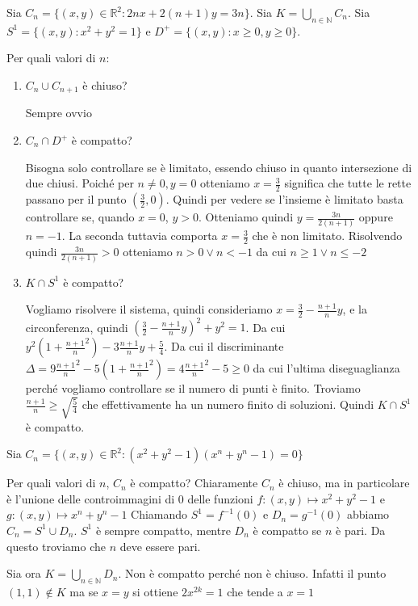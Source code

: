 \begin{example}
    Sia \(C_n = \{(x, y) \in \mathbb{R}^2 : 2 n x + 2 (n+1) y = 3n\} \). Sia \(K
    = \bigcup_{n \in \mathbb{N}} C_n\). Sia \(S^{1} = \{(x, y) : x^2+y^2 = 1\}
    \) e \(D^{+} = \{(x, y) : x \ge 0, y \ge 0\} \).

    Per quali valori di \(n\):
\begin{enumerate}[label = \arabic*.]
    \item \(C_n \cup C_{n+1}\) è chiuso?

        Sempre ovvio
    \item \(C_n \cap D^{+}\) è compatto?

        Bisogna solo controllare se è limitato, essendo chiuso in quanto
        intersezione di due chiusi.
        Poiché per \(n\neq 0, y = 0\) otteniamo \(x = \frac{3}{2}\) significa
        che tutte le rette passano per il punto \((\frac{3}{2}, 0)\). Quindi per
        vedere se l'insieme è limitato basta controllare se, quando \(x=0\), \(y
        > 0\). Otteniamo quindi \(y = \frac{3n}{2(n+1)}\) oppure \(n = -1\). La
        seconda tuttavia comporta \(x = \frac{3}{2}\) che è non limitato.
        Risolvendo quindi \(\frac{3n}{2(n+1)} > 0\) otteniamo \(n > 0 \lor n <
        -1\) da cui \(n \ge 1 \lor n \le -2 \) 
    \item \(K \cap S^{1}\) è compatto?

        Vogliamo risolvere il sistema, quindi consideriamo \(x = \frac{3}{2} -
        \frac{n+1}{n} y\), e la circonferenza, quindi \(\left(\frac{3}{2} -
        \frac{n+1}{n} y \right)^2 + y^2 = 1\). Da cui \(y^2 \left( 1 +
    \frac{n+1}{n}^2 \right) - 3 \frac{n+1}{n} y + \frac{5}{4}\).
        Da cui il discriminante \(\Delta = 9 \frac{n+1}{n}^2 - 5 \left( 1 +
        \frac{n+1}{n}^2 \right) = 4 \frac{n+1}{n}^2 - 5 \ge 0\) da cui l'ultima
        diseguaglianza perché vogliamo controllare se il numero di punti è
        finito. Troviamo \(\frac{n+1}{n} \ge \sqrt{\frac{5}{4}}\) che
        effettivamente ha un numero finito di soluzioni. Quindi \(K \cap S^{1}\)
        è compatto.
\end{enumerate}
\end{example}

\begin{example}
    Sia \(C_n = \{(x, y) \in \mathbb{R}^2 : (x^2+y^2-1)(x^{n} + y^{n} - 1) = 0\} \) 

    Per quali valori di \(n\), \(C_n\) è compatto? Chiaramente \(C_n\) è chiuso,
    ma in particolare è l'unione delle controimmagini di \(0\) delle funzioni
    \(f: (x, y) \mapsto x^2 + y^2 - 1\) e \(g: (x, y) \mapsto x^{n} + y^{n} -
    1\) Chiamando \(S^{1} = f^{-1}(0) \) e \(D_n = g^{-1}(0)\) abbiamo \(C_n =
    S^{1} \cup D_n\). \(S^{1}\) è sempre compatto, mentre \(D_n\) è compatto se
    \(n\) è pari. Da questo troviamo che \(n\) deve essere pari.

    Sia ora \(K= \bigcup_{n \in \mathbb{N}} D_n\). Non è compatto perché non è
    chiuso. Infatti il punto \((1,1) \not\in K\) ma se \(x = y\) si ottiene \(2
    x^{2k} = 1\) che tende a \(x = 1\) 
\end{example}

